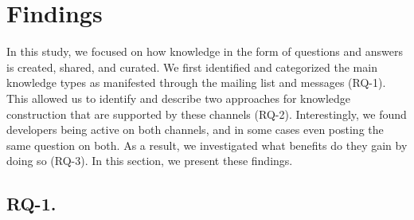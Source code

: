 \section{Findings}
\label{cha:findings}
In this study, we focused on how knowledge in the form of questions and answers is created, shared, and curated. We first identified and categorized the main knowledge types as manifested through the \RH mailing list and \SO messages (RQ-1). This allowed us to identify and describe two approaches for knowledge construction that are supported by these channels (RQ-2). Interestingly, we found developers being active on both channels, and in some cases even posting the same question on both. As a result, we investigated what benefits do they gain by doing so (RQ-3). In this section, we present these findings.


\subsection{RQ-1. \rqa}
\label{cha:findings-types}

